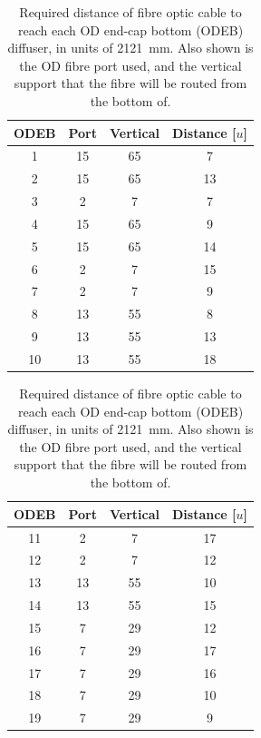\documentclass[a4paper,11pt]{article}
\begin{document}
\begin{table}[h!]
\centering
\begin{tabular}[t]{cccc}\toprule
ODEB	&  Port         &	Vertical	&	Distance [$u$]	\\ \midrule
1		&  15           &		65		&	7		\\
2		&  15           &	    65		&	13		\\
3		&	2           &      	7		&	7		\\
4		&  15    		&       65		&	9		\\
5		&  15           &	    65		&	14		\\
6		&	2           &      	7		&	15		\\
7		&	2           &      	7		&	9		\\
8		&	13          &       55		&	8		\\
9		&	13          &      	55		&	13		\\
10		&	13          &	    55		&	18		\\	\bottomrule
\end{tabular}
\hspace{1cm}
\begin{tabular}[t]{cccc}\toprule
ODEB	&	Port        &    Vertical	&	Distance [$u$]	\\ \midrule
11		&	2           &	7		&	17		\\
12		&	2           &	7		&	12		\\
13		&	13          &	55		&	10		\\
14		&	13          &	55		&	15		\\
15		&	7           &	29		&	12		\\
16		&	7           &	29		&	17		\\
17		&	7           &	29		&	16		\\
18		&	7           &	29		&	10		\\
19		&	7           & 	29		&	9		\\	\bottomrule
\end{tabular}
\caption{Required distance of fibre optic cable to reach each OD end-cap bottom (ODEB) diffuser, in units of 2121~mm. Also shown is the OD fibre port used, and the vertical support that the fibre will be routed from the bottom of.}\label{tab:bottomEndCapLen}
\end{table}
\end{document}
